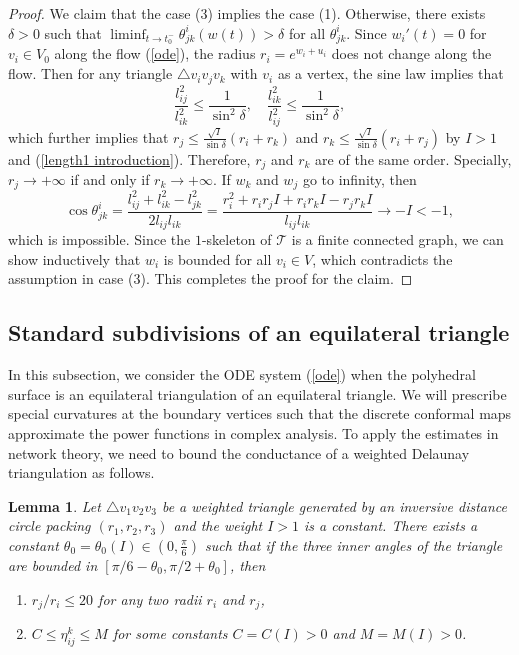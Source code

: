 \documentclass[12pt]{amsart}
\newtheorem{lemma}[theorem]{Lemma}
\begin{document}
\begin{proof}
    We claim that the case (3) implies the case (1).
    Otherwise, there exists $\delta>0$ such that $\liminf_{t \to t_0^-} \theta^i_{jk}(w(t))>\delta$ for all $\theta^i_{jk}$. Since $w_i'(t) = 0$ for $v_i \in V_0$ along the flow (\ref{ode}), the radius $r_i = e^{w_i+u_i}$ does not change along the flow. Then for any triangle $\triangle v_iv_jv_k$
    with $v_i$ as a vertex, the sine law implies that
    $$\frac{{l_{ij}^2}}{{l_{ik}^2}} \le \frac{1}{{{{\sin }^2}\delta }}, \quad \frac{{l_{ik}^2}}{{l_{ij}^2}} \le \frac{1}{{{{\sin }^2}\delta }},$$
which further implies that ${r_j} \le \frac{{\sqrt I }}{{\sin \delta }}({r_i} + {r_k})$ and ${r_k} \le \frac{{\sqrt I }}{{\sin \delta }}({r_i} + {r_j}) $ by $I>1$ and (\ref{length1 introduction}). Therefore, ${r_j}$ and ${r_k}$ are of the same order.
Specially, $r_j\rightarrow +\infty$ if and only if $r_k\rightarrow +\infty$.
If $w_k$ and $w_j$ go to infinity,  then
$$\cos \theta _{jk}^i = \frac{{l_{ij}^2 + l_{ik}^2 - l_{jk}^2}}{{2{l_{ij}}{l_{ik}}}} = \frac{{r_i^2 + {r_i}{r_j}I + {r_i}{r_k}I - {r_j}{r_k}I}}{{{l_{ij}}{l_{ik}}}} \to -I<-1,$$
   which is impossible. Since the $1$-skeleton of $\mathcal{T}$ is a finite connected graph, we can show inductively that $w_i$ is bounded for all $v_i\in V$, which contradicts the assumption in case (3). This completes the proof for the claim.
\end{proof}

\subsection{Standard subdivisions of an equilateral triangle}
In this subsection, we consider the ODE system (\ref{ode}) when the polyhedral surface is an equilateral triangulation of an equilateral triangle. We will prescribe special curvatures at the boundary vertices such that the discrete conformal maps approximate the power functions in complex analysis. To apply the estimates in network theory, we need to bound the conductance of a weighted Delaunay triangulation as follows.

\begin{lemma}
\label{ratio}
	Let $\triangle v_1v_2v_3$ be a weighted triangle generated by an inversive distance  circle packing $(r_1, r_2, r_3)$ and the weight $I>1$ is a constant. There exists a constant $\theta_0 = \theta_0(I)\in (0, \frac{\pi}{6})$ such that if the three inner angles of the triangle are bounded in $[\pi /6 - \theta_0,  \pi/2 + \theta_0]$, then
	\begin{enumerate}
		\item[(a)] $r_j/r_i \leq 20$ for any two radii $r_i$ and $r_j$,
		\item[(b)] $C\leq \eta_{ij}^k \leq M$ for some constants $C = C(I)>0$  and $M = M(I)>0$.
	\end{enumerate}
\end{lemma}
\end{document}
